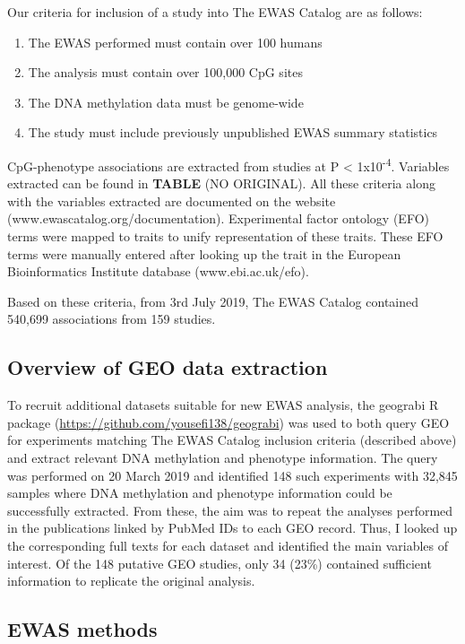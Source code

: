 \documentclass[11pt,twoside]{bristolthesis}
\providecommand{\tightlist}{%
  \setlength{\itemsep}{0pt}\setlength{\parskip}{0pt}}
\begin{document}
Our criteria for inclusion of a study into The EWAS Catalog are as follows:
\begin{enumerate}
\def\labelenumi{\arabic{enumi}.}
\tightlist
\item
  The EWAS performed must contain over 100 humans
\item
  The analysis must contain over 100,000 CpG sites
\item
  The DNA methylation data must be genome-wide
\item
  The study must include previously unpublished EWAS summary statistics
\end{enumerate}
CpG-phenotype associations are extracted from studies at P \textless{} 1x10\textsuperscript{-4}. Variables extracted can be found in \textbf{TABLE} (NO ORIGINAL). All these criteria along with the variables extracted are documented on the website (www.ewascatalog.org/documentation). Experimental factor ontology (EFO) terms were mapped to traits to unify representation of these traits. These EFO terms were manually entered after looking up the trait in the European Bioinformatics Institute database (www.ebi.ac.uk/efo).

Based on these criteria, from 3rd July 2019, The EWAS Catalog contained 540,699 associations from 159 studies.

\hypertarget{overview-of-geo-data-extraction}{%
\subsection{Overview of GEO data extraction}\label{overview-of-geo-data-extraction}}

To recruit additional datasets suitable for new EWAS analysis, the geograbi R package (\url{https://github.com/yousefi138/geograbi}) was used to both query GEO for experiments matching The EWAS Catalog inclusion criteria (described above) and extract relevant DNA methylation and phenotype information. The query was performed on 20 March 2019 and identified 148 such experiments with 32,845 samples where DNA methylation and phenotype information could be successfully extracted. From these, the aim was to repeat the analyses performed in the publications linked by PubMed IDs to each GEO record. Thus, I looked up the corresponding full texts for each dataset and identified the main variables of interest. Of the 148 putative GEO studies, only 34 (23\%) contained sufficient information to replicate the original analysis.

\hypertarget{ewas-methods}{%
\subsection{EWAS methods}\label{ewas-methods}}
\end{document}
